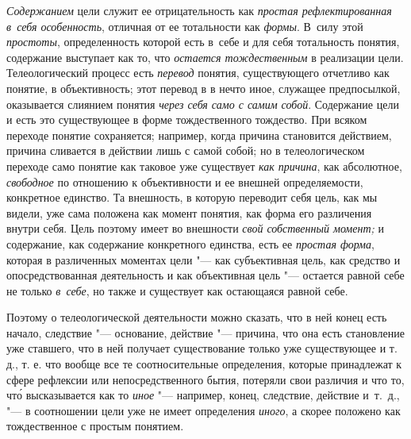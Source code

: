 {\em Содержанием} цели
служит ее отрицательность как
{\em простая рефлектированная в~себя
особенность}, отличная от ее тотальности как
{\em формы}. В~силу этой
{\em простоты},
определенность которой есть в~себе и для себя тотальность
понятия, содержание выступает как то, что
{\em остается тождественным}
в реализации цели. Телеологический процесс есть
{\em перевод} понятия,
существующего отчетливо как понятие, в объективность; этот перевод в
в нечто иное, служащее предпосылкой, оказывается слиянием понятия
{\em через себя само с самим собой}.
Содержание цели и есть это существующее в форме
тождественного тождество. При всяком переходе понятие сохраняется;
например, когда причина становится действием, причина сливается в действии
лишь с самой собой; но в телеологическом переходе само понятие как таковое
уже существует {\em как причина},
как абсолютное,
{\em свободное} по
отношению к объективности и ее внешней определяемости, конкретное единство.
Та внешность, в которую переводит себя цель, как мы видели, уже сама
положена как момент понятия, как форма его различения внутри себя. Цель
поэтому имеет во внешности {\em свой
собственный момент;} и содержание, как содержание
конкретного единства, есть ее
{\em простая форма},
которая в различенных моментах цели "--- как
субъективная цель, как средство и опосредствованная деятельность и как
объективная цель "--- остается равной себе не только
{\em в~себе}, но также и
существует как остающаяся равной себе.

Поэтому о телеологической деятельности можно сказать, что в
ней конец есть начало, следствие "--- основание, действие
"--- причина, что она есть становление уже ставшего, что в ней
получает существование только уже существующее и т. д., т. е. что вообще
все те соотносительные определения, которые принадлежат к сфере рефлексии
или непосредственного бытия, потеряли свои различия и что то, чт\'{о}
высказывается как то
{\em иное} "--- например,
конец, следствие, действие и~т.~д., "--- в соотношении цели уже
не имеет определения
{\em иного}, а скорее
положено как тождественное с простым понятием.

